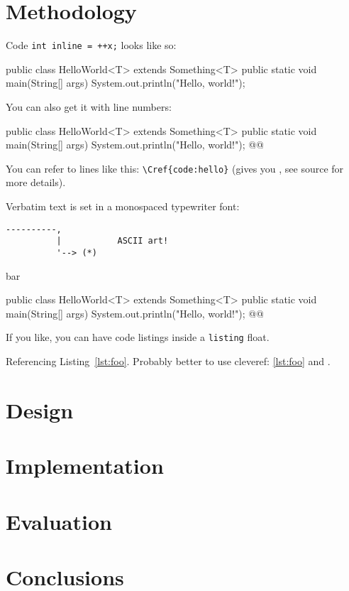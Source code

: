 \documentclass[11pt,titlepage,openright]{book}
\makeatletter
\renewenvironment{listing*}[1][]{%
  \begin{listing}[#1]%
    \checkoddpage%
    \ifoddpage%
      \begin{adjustwidth}{0cm}{-45mm}%
    \else%
      \begin{adjustwidth}{-45mm}{0cm}%
    \fi%
    }{%
    \end{adjustwidth}%
  \end{listing}}
\renewcommand{\c}[1]{\lstinline[style=std]@#1@}
\makeatother
\begin{document}
\chapter{Methodology}
\lipsum[1] Code \c{int inline = ++x;} looks like so:

\begin{Code}
public class HelloWorld<T> extends Something<T> {
  public static void main(String[] args) {
    System.out.println("Hello, world!");
  }
}
\end{Code}

You can also get it with line numbers:

\begin{Code_Numbered}
public class HelloWorld<T> extends Something<T> {
  public static void main(String[] args) {
    System.out.println("Hello, world!"); @\label{code:hello}@
  }
}
\end{Code_Numbered}


You can refer to lines like this: \verb+\Cref{code:hello}+ (gives you , see source for more details).

Verbatim text is set in a monospaced typewriter font:

\begin{verbatim}
----------,
          |           ASCII art!
          '--> (*)
\end{verbatim}

\lipsum[2-4]

\begin{table}[!h]
  \caption{bar}
  \label{tab:bar}
\end{table}

\begin{listing*}[t]
\begin{Code_Numbered}
public class HelloWorld<T> extends Something<T> {
  public static void main(String[] args) {
    System.out.println("Hello, world!"); @\label{code:hello}@
  }
}
\end{Code_Numbered}
\caption{If you like, you can have code listings inside a \c{listing} float.}
\label{lst:foo}
\end{listing*}

Referencing Listing~\ref{lst:foo}.
Probably better to use cleveref: \cref{lst:foo} and .

\chapter{Design}
\lipsum

\chapter{Implementation}
\lipsum

\chapter{Evaluation}
\lipsum

\chapter{Conclusions}
\lipsum



\end{document}
